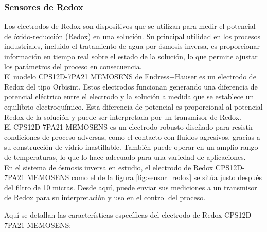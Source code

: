 \subsubsection{Sensores de Redox} \label{sec:sensor_redox}

Los electrodos de Redox son dispositivos que se utilizan para medir el potencial de óxido-reducción (Redox) en una
solución. Su principal utilidad en los procesos industriales, incluido el tratamiento de agua por ósmosis inversa,
es proporcionar información en tiempo real sobre el estado de la solución, lo que permite ajustar los parámetros
del proceso en consecuencia.\\

El modelo CPS12D-7PA21 MEMOSENS de Endress+Hauser es un electrodo de Redox del tipo Orbisint. Estos electrodos
funcionan generando una diferencia de potencial eléctrico entre el electrodo y la solución a medida que se establece
un equilibrio electroquímico. Esta diferencia de potencial es proporcional al potencial Redox de la solución y puede
ser interpretada por un transmisor de Redox.\\

El CPS12D-7PA21 MEMOSENS es un electrodo robusto diseñado para resistir condiciones de proceso adversas, como el
contacto con fluidos agresivos, gracias a su construcción de vidrio inastillable. También puede operar en un amplio
rango de temperaturas, lo que lo hace adecuado para una variedad de aplicaciones.\\

En el sistema de ósmosis inversa en estudio, el electrodo de Redox CPS12D-7PA21 MEMOSENS como el de la figura \ref{fig:sensor_redox}
se sitúa justo después del filtro de 10 micras. Desde aquí, puede enviar sus mediciones a un transmisor de
Redox para su interpretación y uso en el control del proceso.\\



Aquí se detallan las características específicas del electrodo de Redox CPS12D-7PA21 MEMOSENS:\\

